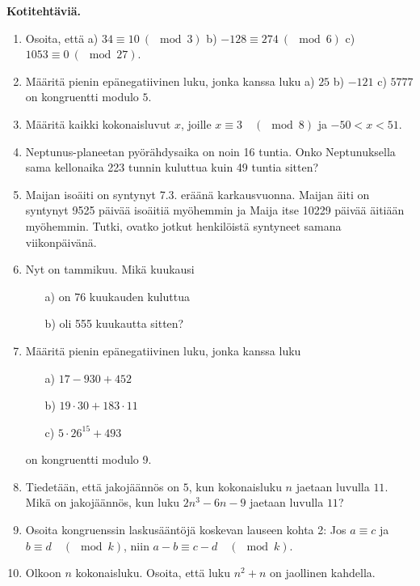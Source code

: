 {\bf Kotitehtäviä.}

\begin{enumerate}

\item
Osoita, että a) $34 \equiv 10\ (\mod 3)$ b) $-128 \equiv 274\ (\mod 6)$ c) $1053 \equiv 0\ (\mod 27)$.

\item
Määritä pienin epänegatiivinen luku, jonka kanssa luku a) $25$ b) $-121$ c) $5777$ on kongruentti modulo $5$.

\item
Määritä kaikki kokonaisluvut $x$, joille $x \equiv 3\quad (\mod 8)$ ja $-50 < x < 51$.

\item Neptunus-planeetan pyörähdysaika on noin 16 tuntia. Onko Neptunuksella sama kellonaika 223 tunnin kuluttua kuin 49 tuntia sitten?

\item Maijan isoäiti on syntynyt 7.3. eräänä karkausvuonna. Maijan äiti on syntynyt 9525 päivää isoäitiä myöhemmin ja Maija itse 10229 päivää äitiään myöhemmin. Tutki, ovatko jotkut henkilöistä syntyneet samana viikonpäivänä.

\item Nyt on tammikuu. Mikä kuukausi
\begin{itemize}
\item[a)] on 76 kuukauden kuluttua
\item[b)] oli 555 kuukautta sitten?
\end{itemize}

\item Määritä pienin epänegatiivinen luku, jonka kanssa luku
\begin{itemize}
\item[a)] $17 - 930 + 452$
\item[b)] $19 \cdot 30 + 183 \cdot 11$
\item[c)] $5 \cdot 26^{15} + 493$
\end{itemize}
on kongruentti modulo 9.

\item
Tiedetään, että jakojäännös on $5$, kun kokonaisluku $n$ jaetaan luvulla $11$. Mikä on jakojäännös, kun luku $2n^3 - 6n - 9$ jaetaan luvulla $11$?

\item
Osoita kongruenssin laskusääntöjä koskevan lauseen kohta 2: Jos $a\equiv c$ ja $b\equiv d\quad (\mod k)$, niin $a-b\equiv c-d \quad(\mod k)$.

\item Olkoon $n$ kokonaisluku. Osoita, että luku $n^2 + n$ on jaollinen kahdella.


\end{enumerate}

